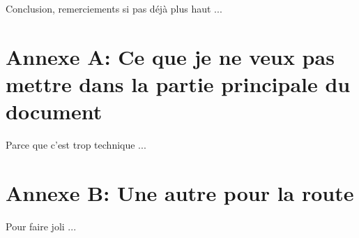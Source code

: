 \documentclass[a4paper,11pt,notitlepage]{report}
\theoremstyle{definition}
\begin{document}
Conclusion, remerciements si pas déjà plus haut ... 





\newpage

\appendix

\section*{Annexe A: Ce que je ne veux pas mettre dans la partie principale du document}

Parce que c'est trop technique ... 


\section*{Annexe B: Une autre pour la route}

Pour faire joli ... 
\end{document}
